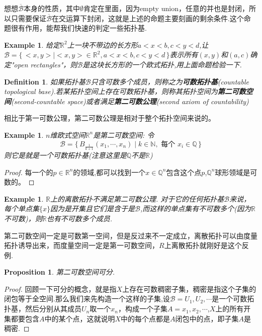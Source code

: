 \documentclass{article}
\newtheorem{proposition}[theorem]{Proposition}
\newtheorem{example}[theorem]{Example}
\newtheorem{definition}[theorem]{Definition}
\newcommand\Set[2]{\{\,#1\mid#2\,\}} %
\begin{document}
想想$\overline{\mathscr{B}}$本身的性质，其中$\emptyset$肯定在里面，因为empty union，任意的并也是封闭，所以只需要保证$\overline{\mathscr{B}}$在交运算下封闭，这就是上述的命题主要刻画的剩余条件.这个命题很有作用，能帮我们快速的判定一些拓扑基.

\begin{example}
给定$\mathbb{R}^2$上一块不带边的长方形$a < x < b, c < y < d$,让$\mathscr{B} = \Set{<x,y>}{<x,y> \in \mathbb{R}^2, a<x<b,c <y <d}$表示所有$(x,y)$和$(a,c)$确定"open rectangles"，则$\mathscr{B}$是这块长方形的一个欧式拓扑,用上面命题检验一下.
\end{example}

\begin{definition}
如果拓扑基$\mathscr{B}$只含可数多个成员，则称之为\textbf{可数拓扑基}(countable topological base).若某拓扑空间上存在可数拓扑基，则称其拓扑空间为\textbf{第二可数空间}(second-countable space)或者满足\textbf{第二可数公理}(second axiom of countability)
\end{definition}

相比于第一可数公理，第二可数公理是相对于整个拓扑空间来说的。

\begin{example}
$n$维欧式空间$\mathbb{R}^n$是第二可数空间: 令\[\mathscr{B}=\Set{B_{\frac{1}{k+1}}(x_1,\cdots,x_n)}{k \in \mathbb{N},\text{ 每个 } x_i \in \mathbb{Q}}\]则它是就是一个可数拓扑基(注意这里是$\mathbb{Q}$不是$\mathbb{R}$)
\end{example}

\begin{proof}
每一个的$p \in \mathbb{R}^n$的领域,都可以找到一个$x \in \mathbb{Q}^n$包含这个点$p$,$\mathbb{Q}^n$球形领域是可数的。
\end{proof}

\begin{example}
$\mathbb{R}$上的离散拓扑不满足第二可数公理. 对于它的任何拓扑基$\mathscr{B}$来说，每个单点集$\{x\}$因为是开集且它们是含于是$\mathscr{B}$,而这样的单点集有不可数多个(因为$\mathbb{R}$不可数)，则$\mathbb{R}$也有不可数多个成员.
\end{example}

第二可数空间一定是可数第一空间，但是反过来不一定成立，离散拓扑可以由度量拓扑诱导出来，而度量空间一定是第一可数空间，$R$上离散拓扑就刚好是这个反例.

\begin{proposition}
第二可数空间可分.
\end{proposition}

\begin{proof}
回顾一下可分的概念，就是指$X$上存在可数稠密子集，稠密是指这个子集的闭包等于全空间.那么我们来先构造一个这样的子集,设$\mathscr{B}={U_1,U_2,\cdots}$是一个可数拓扑基，然后分别从其成员$U_n$取一个$x_n$，构成一个子集$A={x_1,x_2,\cdots}$,$X$上的所有开集都要包含$A$中的某个点，这就说明$X$中的每个点都是$A$闭包中的点，即子集$A$是稠密.
\end{proof}
\end{document}
